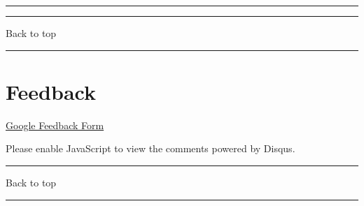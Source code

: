 \documentclass[
]{article}
\begin{document}
\begin{center}\rule{0.5\linewidth}{0.5pt}\end{center}

\begin{center}\rule{0.5\linewidth}{0.5pt}\end{center}

Back to top

\begin{center}\rule{0.5\linewidth}{0.5pt}\end{center}

\pagebreak

\hypertarget{feedback}{%
\section{Feedback}\label{feedback}}

\href{https://docs.google.com/forms/d/e/1FAIpQLSeD3Z9J6Y7eMmiyM12f_SfAmHUlykb1zxZcwO6lg7cebGYQIQ/viewform}{Google
Feedback Form}

\hypertarget{disqus_thread}{}

Please enable JavaScript to view the comments powered by Disqus.

\begin{center}\rule{0.5\linewidth}{0.5pt}\end{center}

Back to top

\begin{center}\rule{0.5\linewidth}{0.5pt}\end{center}

\pagebreak
\end{document}

